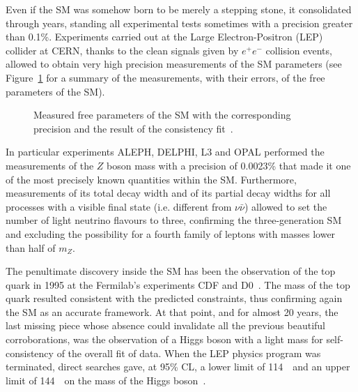 Even if the SM was somehow born to be merely a stepping stone, 
it consolidated through years, standing all experimental tests 
sometimes with a precision greater than 0.1\%. Experiments carried 
out at the Large Electron-Positron (LEP) collider at CERN, 
thanks to the clean signals given by $e^{+}e^{-}$ collision events, 
allowed to obtain very high precision measurements of the SM parameters
(see Figure~\ref{fig:smparam} for a summary of the measurements, with
their errors, of the free parameters of the SM).
\begin{figure}[htb]\begin{center}
	\caption{Measured free parameters of the SM with the corresponding
          precision and the result of the consistency fit~\cite{Renton}.\label{fig:smparam}}
\end{center}\end{figure}
 
In particular experiments ALEPH, DELPHI, L3 and OPAL performed the measurements 
of the $Z$ boson mass with a precision of 0.0023\% that made it one of the most 
precisely known quantities within the SM. %
Furthermore, measurements of its total 
decay width and of its partial decay widths for all processes with a 
visible final state (i.e. different from $\nu\bar\nu$) allowed to set 
the number of light neutrino flavours to three, confirming the three-generation 
SM and excluding the possibility for a fourth family of leptons with masses
 lower than half of $m_Z$.

The penultimate discovery inside the SM has been the observation of the 
top quark in 1995 at the Fermilab's experiments CDF and 
D0~\cite{PhysRevLett.74.2626,PhysRevLett.74.2422}. 
The mass of the top quark resulted consistent with the predicted 
constraints, thus confirming again the SM as an accurate framework. 
At that point, and for almost 20 years, the last missing piece whose
absence could invalidate all the previous beautiful corroborations, was
the observation of a Higgs boson with a light mass for  self-consistency 
of the overall fit of data. When the LEP physics program was terminated,
direct searches gave, at 95\% CL, a lower limit of 114~\gev\ and an upper 
limit of 144~\gev\ on the mass of the Higgs boson~\cite{Renton}.


